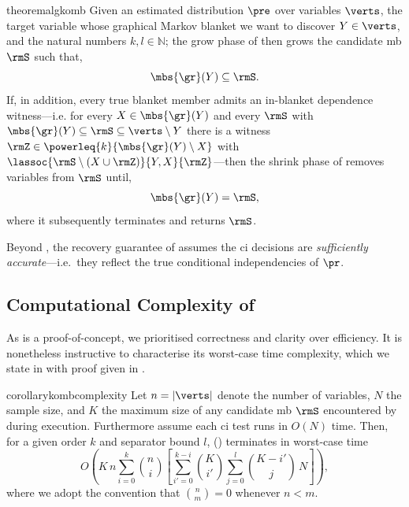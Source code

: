 \documentclass[accepted]{uai2026} %
\theoremstyle{plain}
\theoremstyle{definition}
\theoremstyle{remark}
\begin{document}
\begin{restatable}{theorem}{algkomb}
  \label{thm:algkomb}
  Given an estimated distribution $\pre$ over variables $\verts$, the
  target variable whose graphical Markov blanket we want to discover
  $Y\in\verts$,
  and the natural numbers $k,l\in\mathbb{N}$; the grow phase of
  {\method} then grows the candidate \gls{mb} $\rmS$ such that,
  \begin{equation}
    \label{eq:27}
    \mbs{\gr}(Y) \subseteq \rmS.
  \end{equation}
  If, in addition, every true blanket member admits an in-blanket
  dependence witness---i.e. for every $X\in\mbs{\gr}(Y)$ and every
  $\rmS$ with $\mbs{\gr}(Y)\subseteq\rmS\subseteq\verts\setminus Y$
  there is a witness $\rmZ\in\powerleq{k}{\mbs{\gr}(Y)\setminus X}$ with
  $\lassoc{\rmS\setminus(X\cup\rmZ)}{Y,X}{\rmZ}$---then the shrink phase
  of {\method} removes variables from $\rmS$ until,
  \begin{equation}
    \label{eq:28}
    \mbs{\gr}(Y) = \rmS,
  \end{equation}
  where it subsequently terminates and returns $\rmS$.
\end{restatable}

Beyond , the recovery
guarantee of  assumes the \gls{ci} decisions are
\emph{sufficiently accurate}---i.e.\ they reflect the true conditional
independencies of $\pr$.

\subsection{Computational Complexity of {\method}}\label{sec:complexity}
As {\method} is a proof-of-concept, we prioritised correctness and
clarity over efficiency. It is nonetheless instructive to characterise
its worst-case time complexity, which we state in
 with proof given in .

\begin{restatable}{corollary}{kombcomplexity}
  \label{cor:complexity}
  Let $n=|\verts|$ denote the number of variables, $N$ the sample size,
  and $K$ the maximum size of any candidate \gls{mb} $\rmS$ encountered
  by  during execution. Furthermore assume each \gls{ci}
  test runs in $O(N)$ time. Then, for a given order $k$ and separator
  bound $l$, {\method} () terminates in worst-case time
  \begin{equation}
    \label{eq:complexity}
    O\!\left(
      K\, n \sum_{i=0}^{k}\binom{n}{i}
      \left[
        \sum_{i'=0}^{k-i}\binom{K}{i'}
        \sum_{j=0}^{l}\binom{K-i'}{j}\, N
      \right]
    \right),
  \end{equation}
  where we adopt the convention that $\binom{n}{m}=0$ whenever $n<m$.
\end{restatable}
\end{document}
